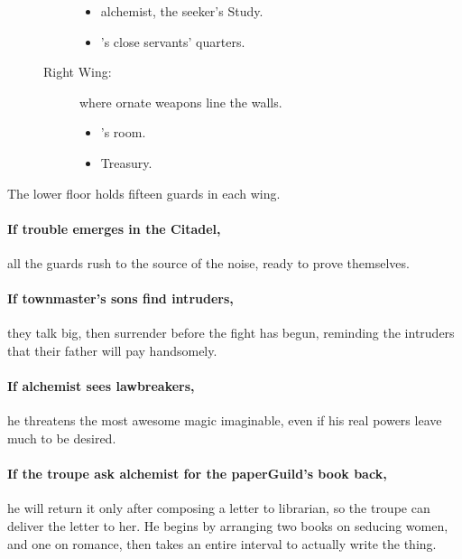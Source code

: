 \begin{multicols}{2}
\begin{description}
\begin{description}
      \begin{itemize}
        \item
        \gls{alchemist}, the \gls{seeker}'s Study.
        \item
        's close servants' quarters.
      \end{itemize}
      \item[Right Wing:]
      where ornate weapons line the walls.
      \begin{itemize}
        \item
        's room.
        \item
        Treasury.
      \end{itemize}
    \end{description}
\end{description}

The lower floor holds fifteen guards in each wing.


\paragraph{If trouble emerges in the Citadel,}
all the guards rush to the source of the noise, ready to prove themselves.


\paragraph{If \gls{townmaster}'s sons find intruders,}
they talk big, then surrender before the fight has begun, reminding the intruders that their father will pay handsomely.

\citadelAlchemist

\showStdSpells

\label{citadel_alchemist}

\paragraph{If \gls{alchemist} sees lawbreakers,}
he threatens the most awesome magic imaginable, even if his real powers leave much to be desired.

\paragraph{If the troupe ask \gls{alchemist} for the \gls{paperGuild}'s book back,}
he will return it only after composing a letter to \gls{librarian}, so the troupe can deliver the letter to her.
He begins by arranging two books on seducing women, and one on romance, then takes an entire \gls{interval} to actually write the thing. 


\end{multicols}
